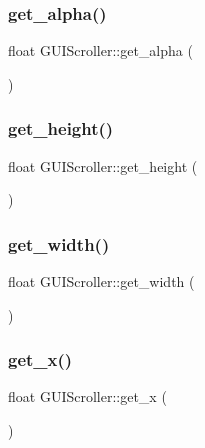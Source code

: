 \subsubsection{\texorpdfstring{get\+\_\+alpha()}{get\_alpha()}}
{\footnotesize\ttfamily float G\+U\+I\+Scroller\+::get\+\_\+alpha (\begin{DoxyParamCaption}{ }\end{DoxyParamCaption})}

\hypertarget{class_g_u_i_scroller_ad5166bdbe1841d02d90b6e74e4bf2586}{}\label{class_g_u_i_scroller_ad5166bdbe1841d02d90b6e74e4bf2586} 
\subsubsection{\texorpdfstring{get\+\_\+height()}{get\_height()}}
{\footnotesize\ttfamily float G\+U\+I\+Scroller\+::get\+\_\+height (\begin{DoxyParamCaption}{ }\end{DoxyParamCaption})}

\hypertarget{class_g_u_i_scroller_a853c12d4b8f7d31c37f75d8d6c39db68}{}\label{class_g_u_i_scroller_a853c12d4b8f7d31c37f75d8d6c39db68} 
\subsubsection{\texorpdfstring{get\+\_\+width()}{get\_width()}}
{\footnotesize\ttfamily float G\+U\+I\+Scroller\+::get\+\_\+width (\begin{DoxyParamCaption}{ }\end{DoxyParamCaption})}

\hypertarget{class_g_u_i_scroller_ad61c9e0e6a5ea89ace8a8ac2e70d2887}{}\label{class_g_u_i_scroller_ad61c9e0e6a5ea89ace8a8ac2e70d2887} 
\subsubsection{\texorpdfstring{get\+\_\+x()}{get\_x()}}
{\footnotesize\ttfamily float G\+U\+I\+Scroller\+::get\+\_\+x (\begin{DoxyParamCaption}{ }\end{DoxyParamCaption})}

